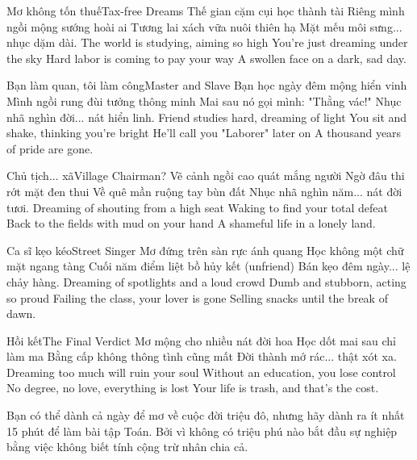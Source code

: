 \begin{tutuyetbox}{Mơ không tốn thuế}{Tax-free Dreams}
Thế gian cặm cụi học thành tài
Riêng mình ngồi mộng sướng hoài ai
Tương lai xách vữa nuôi thiên hạ
Mặt mếu môi sưng... nhục dặm dài.
\tcblower
The world is studying, aiming so high
You're just dreaming under the sky
Hard labor is coming to pay your way
A swollen face on a dark, sad day.
\end{tutuyetbox}

\begin{tutuyetbox}{Bạn làm quan, tôi làm công}{Master and Slave}
Bạn học ngày đêm mộng hiển vinh
Mình ngồi rung đùi tưởng thông minh
Mai sau nó gọi mình: "Thằng vác!"
Nhục nhã nghìn đời... nát hiển linh.
\tcblower
Friend studies hard, dreaming of light
You sit and shake, thinking you're bright
He'll call you "Laborer" later on
A thousand years of pride are gone.
\end{tutuyetbox}

\begin{tutuyetbox}{Chủ tịch... xã}{Village Chairman?}
Vẽ cảnh ngồi cao quát mắng người
Ngờ đâu thi rớt mặt đen thui
Về quê mần ruộng tay bùn đất
Nhục nhã nghìn năm... nát đời tươi.
\tcblower
Dreaming of shouting from a high seat
Waking to find your total defeat
Back to the fields with mud on your hand
A shameful life in a lonely land.
\end{tutuyetbox}

\begin{tutuyetbox}{Ca sĩ kẹo kéo}{Street Singer}
Mơ đứng trên sàn rực ánh quang
Học không một chữ mặt ngang tàng
Cuối năm điểm liệt bồ hủy kết (unfriend)
Bán kẹo đêm ngày... lệ chảy hàng.
\tcblower
Dreaming of spotlights and a loud crowd
Dumb and stubborn, acting so proud
Failing the class, your lover is gone
Selling snacks until the break of dawn.
\end{tutuyetbox}

\begin{tutuyetbox}{Hồi kết}{The Final Verdict}
Mơ mộng cho nhiều nát đời hoa
Học dốt mai sau chỉ làm ma
Bằng cấp không thông tình cũng mất
Đời thành mớ rác... thật xót xa.
\tcblower
Dreaming too much will ruin your soul
Without an education, you lose control
No degree, no love, everything is lost
Your life is trash, and that's the cost.
\end{tutuyetbox}

\begin{ghichu}
Bạn có thể dành cả ngày để mơ về cuộc đời triệu đô, nhưng hãy dành ra ít nhất 15 phút để làm bài tập Toán. Bởi vì không có triệu phú nào bắt đầu sự nghiệp bằng việc không biết tính cộng trừ nhân chia cả.
\end{ghichu}